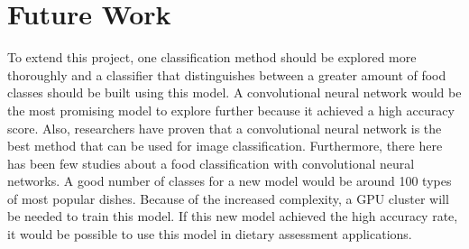 \section{Future Work}

To extend this project, one classification method should be explored more thoroughly and a classifier that distinguishes between a greater amount of food classes should be built using this model.   A convolutional neural network would be the most promising model to explore further because it achieved a high accuracy score. Also, researchers have proven that a convolutional neural network is the best method that can be used for image classification. Furthermore, there here has been few studies about a food classification with convolutional neural networks.  A good number of classes for a new model would be around 100 types of most popular dishes.  Because of the increased complexity, a GPU cluster will be needed to train this model. If this new model achieved the high accuracy rate, it would be possible to use this model in dietary assessment applications.


